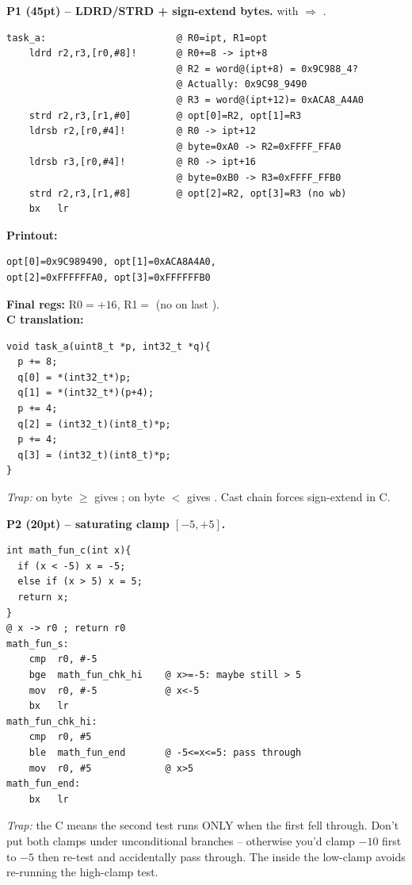 \begin{qp}\textbf{P1 (45pt) -- LDRD/STRD + sign-extend bytes.}
 with  $\Rightarrow$ .
\begin{lstlisting}
task_a:                       @ R0=ipt, R1=opt
    ldrd r2,r3,[r0,#8]!       @ R0+=8 -> ipt+8
                              @ R2 = word@(ipt+8) = 0x9C988_4?
                              @ Actually: 0x9C98_9490
                              @ R3 = word@(ipt+12)= 0xACA8_A4A0
    strd r2,r3,[r1,#0]        @ opt[0]=R2, opt[1]=R3
    ldrsb r2,[r0,#4]!         @ R0 -> ipt+12
                              @ byte=0xA0 -> R2=0xFFFF_FFA0
    ldrsb r3,[r0,#4]!         @ R0 -> ipt+16
                              @ byte=0xB0 -> R3=0xFFFF_FFB0
    strd r2,r3,[r1,#8]        @ opt[2]=R2, opt[3]=R3 (no wb)
    bx   lr
\end{lstlisting}
\textbf{Printout:}
\begin{lstlisting}
opt[0]=0x9C989490, opt[1]=0xACA8A4A0,
opt[2]=0xFFFFFFA0, opt[3]=0xFFFFFFB0
\end{lstlisting}
\textbf{Final regs:} R0$=$$+16$, R1$=$ (no \asm{!} on last ).\\
\textbf{C translation:}
\begin{lstlisting}
void task_a(uint8_t *p, int32_t *q){
  p += 8;
  q[0] = *(int32_t*)p;
  q[1] = *(int32_t*)(p+4);
  p += 4;
  q[2] = (int32_t)(int8_t)*p;
  p += 4;
  q[3] = (int32_t)(int8_t)*p;
}
\end{lstlisting}
\emph{Trap:}  on byte $\geq$ gives ; on byte $<$ gives . Cast chain  forces sign-extend in C.
\end{qp}

\begin{qp}\textbf{P2 (20pt) -- saturating clamp $[-5,+5]$.}
\begin{lstlisting}
int math_fun_c(int x){
  if (x < -5) x = -5;
  else if (x > 5) x = 5;
  return x;
}
@ x -> r0 ; return r0
math_fun_s:
    cmp  r0, #-5
    bge  math_fun_chk_hi    @ x>=-5: maybe still > 5
    mov  r0, #-5            @ x<-5
    bx   lr
math_fun_chk_hi:
    cmp  r0, #5
    ble  math_fun_end       @ -5<=x<=5: pass through
    mov  r0, #5             @ x>5
math_fun_end:
    bx   lr
\end{lstlisting}
\emph{Trap:} the C  means the second test runs ONLY when the first fell through. Don't put both clamps under unconditional branches -- otherwise you'd clamp $-10$ first to $-5$ then re-test and accidentally pass through. The  inside the low-clamp avoids re-running the high-clamp test.
\end{qp}

